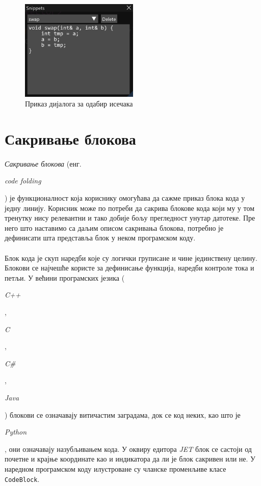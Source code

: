 \documentclass[12pt,oneside]{memoir}
\begin{document}
\begin{figure}[!ht]
	\centering
	\includegraphics[width=0.5\textwidth]{images/code_snippets.png}
	\caption{Приказ дијалога за одабир исечака}
	\label{fig:code_snippets}
\end{figure} 

\section{Сакривање блокова}
\paragraph{}
\emph{Сакривање блокова} (енг. \begin{latinica}\textit{code folding}\end{latinica}) је функционалност која кориснику омогућава да сажме 
приказ блока кода у једну линију. Корисник може по потреби да сакрива блокове
кода који му у том тренутку нису релевантни и тако добије бољу прегледност
унутар датотеке. Пре него што наставимо са даљим описом сакривања блокова,
потребно је дефинисати шта представља блок у неком програмском коду.

\paragraph{}
Блок кода је скуп наредби које су логички груписане и чине јединствену целину.
Блокови се најчешће користе за дефинисање функција, наредби контроле тока и петљи.
У већини програмских језика (\begin{latinica}\textit{C++}\end{latinica},
\begin{latinica}\textit{C}\end{latinica}, \begin{latinica}\textit{C\#}\end{latinica},
\begin{latinica}\textit{Java}\end{latinica}) блокови се означавају витичастим заградама, док се код неких, као што је \begin{latinica}\textit{Python}\end{latinica}, они означавају назубљивањем кода. У оквиру едитора \textit{JET} блок се састоји
од почетне и крајње координате као и индикатора да ли је блок сакривен или не.
У наредном програмском коду илустроване су чланске променљиве класе \verb|CodeBlock|.
\end{document}
